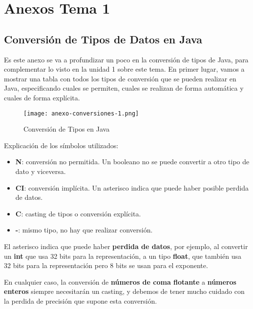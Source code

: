 \appendix


\chapter{Anexos Tema 1}

\section{Conversión de Tipos de Datos en Java}
Es este anexo se va a profundizar un poco en la conversión de tipos de Java, para complementar lo visto en la unidad 1 sobre este tema. En primer lugar, vamos a mostrar una tabla con todos los tipos de conversión que se pueden realizar en Java, especificando cuales se permiten, cuales se realizan de forma automática y cuales de forma explícita.

\begin{figure}[H]
    \centering
    \texttt{[image: anexo-conversiones-1.png]}
    \caption{Conversión de Tipos en Java}
\end{figure}

Explicación de los símbolos utilizados:

\begin{itemize}
    \item \textbf{N}: conversión no permitida. Un booleano no se puede convertir a otro tipo de dato y viceversa.
    \item \textbf{CI}: conversión implícita. Un asterisco indica que puede haber posible perdida de datos.
    \item \textbf{C}: casting de tipos o conversión explícita.
    \item \textbf{-}: mismo tipo, no hay que realizar conversión.
\end{itemize}

El asterisco indica que puede haber \textbf{perdida de datos}, por ejemplo, al convertir un \textbf{int} que usa 32 bits para la representación, a un tipo \textbf{float}, que también usa 32 bits para la representación pero 8 bits se usan para el exponente.

En cualquier caso, la conversión de \textbf{números de coma flotante} a \textbf{números enteros} siempre necesitarán un casting, y debemos de tener mucho cuidado con la perdida de precisión que supone esta conversión.

